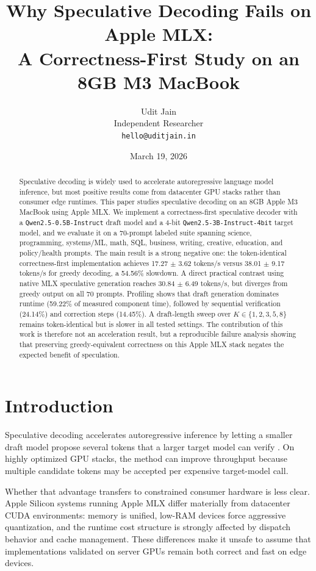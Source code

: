 \documentclass[11pt]{article}
\title{\textbf{Why Speculative Decoding Fails on Apple MLX:}\\
\textbf{A Correctness-First Study on an 8GB M3 MacBook}}
\author{
  Udit Jain \\
  Independent Researcher \\
  \texttt{hello@uditjain.in}
}
\date{March 19, 2026}
\begin{document}
\maketitle

\begin{abstract}
Speculative decoding is widely used to accelerate autoregressive language model inference, but most positive results come from datacenter GPU stacks rather than consumer edge runtimes. This paper studies speculative decoding on an 8GB Apple M3 MacBook using Apple MLX. We implement a correctness-first speculative decoder with a \texttt{Qwen2.5-0.5B-Instruct} draft model and a 4-bit \texttt{Qwen2.5-3B-Instruct-4bit} target model, and we evaluate it on a 70-prompt labeled suite spanning science, programming, systems/ML, math, SQL, business, writing, creative, education, and policy/health prompts. The main result is a strong negative one: the token-identical correctness-first implementation achieves 17.27 $\pm$ 3.62 tokens/s versus 38.01 $\pm$ 9.17 tokens/s for greedy decoding, a 54.56\% slowdown. A direct practical contrast using native MLX speculative generation reaches 30.84 $\pm$ 6.49 tokens/s, but diverges from greedy output on all 70 prompts. Profiling shows that draft generation dominates runtime (59.22\% of measured component time), followed by sequential verification (24.14\%) and correction steps (14.45\%). A draft-length sweep over $K \in \{1,2,3,5,8\}$ remains token-identical but is slower in all tested settings. The contribution of this work is therefore not an acceleration result, but a reproducible failure analysis showing that preserving greedy-equivalent correctness on this Apple MLX stack negates the expected benefit of speculation.
\end{abstract}

\section{Introduction}

Speculative decoding accelerates autoregressive inference by letting a smaller draft model propose several tokens that a larger target model can verify \cite{leviathan2023fast, chen2023accelerating}. On highly optimized GPU stacks, the method can improve throughput because multiple candidate tokens may be accepted per expensive target-model call.

Whether that advantage transfers to constrained consumer hardware is less clear. Apple Silicon systems running Apple MLX differ materially from datacenter CUDA environments: memory is unified, low-RAM devices force aggressive quantization, and the runtime cost structure is strongly affected by dispatch behavior and cache management. These differences make it unsafe to assume that implementations validated on server GPUs remain both correct and fast on edge devices.
\end{document}

